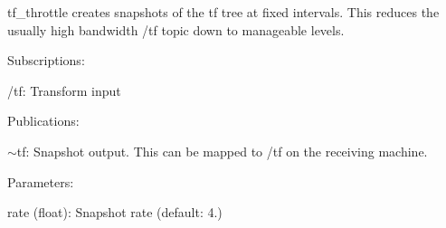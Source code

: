 {\ttfamily tf\+\_\+throttle} creates snapshots of the tf tree at fixed intervals. This reduces the usually high bandwidth {\ttfamily /tf} topic down to manageable levels.

Subscriptions\+:
\begin{DoxyItemize}
\item {\ttfamily /tf}\+: Transform input
\end{DoxyItemize}

Publications\+:
\begin{DoxyItemize}
\item {\ttfamily $\sim$tf}\+: Snapshot output. This can be mapped to {\ttfamily /tf} on the receiving machine.
\end{DoxyItemize}

Parameters\+:
\begin{DoxyItemize}
\item {\ttfamily rate} (float)\+: Snapshot rate (default\+: 4.) 
\end{DoxyItemize}